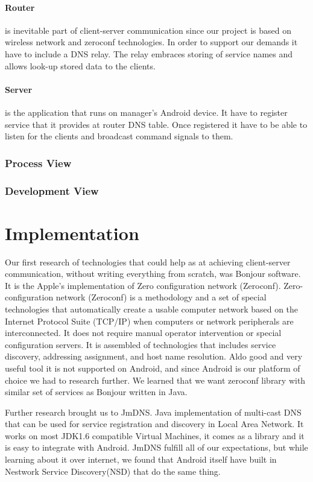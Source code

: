 \paragraph{Router}
is inevitable part of client-server communication since our project is based on wireless network and zeroconf technologies. In order to support our demands it have to include a DNS relay. The relay embraces storing of service names and allows look-up stored data to the clients.

\paragraph{Server}
is the application that runs on manager's Android device. It have to register service that it provides at router DNS table. Once registered it have to be able to listen for the clients and broadcast command signals to them.

\subsubsection{Process View}

\subsubsection{Development View}

\section{Implementation}

Our first research of technologies that could help as at achieving client-server communication, without writing everything from scratch, was Bonjour software. 
It is the Apple's implementation of Zero configuration network (Zeroconf). 
Zero-configuration network (Zeroconf)  is a methodology and a set of special technologies that automatically create a usable computer network based on the Internet Protocol Suite (TCP/IP) when computers or network peripherals are interconnected. 
It does not require manual operator intervention or special configuration servers.
It is assembled of technologies that includes service discovery, addressing assignment, and host name resolution.
Aldo good and very useful tool it is not supported on Android, and since Android is our platform of choice we had to research further. 
We learned that we want zeroconf library with similar set of services as Bonjour written in Java.


Further research brought us to JmDNS. Java implementation of multi-cast DNS that can be used for service registration and discovery in Local Area Network. 
It works on most JDK1.6 compatible Virtual Machines, it comes as a library and it is easy to integrate with Android. 
JmDNS fulfill all of our expectations, but while learning about it over internet, we found that Android itself have built in Nestwork Service Discovery(NSD) that do the same thing.


